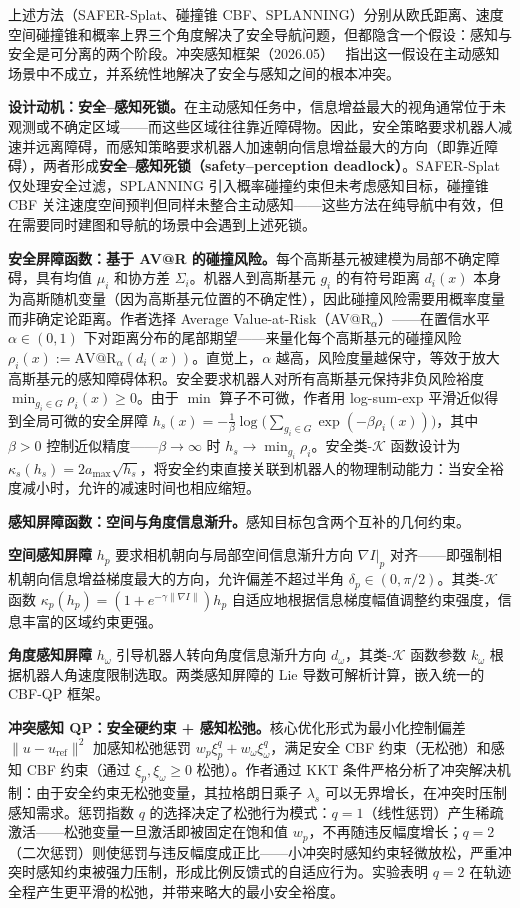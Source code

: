 上述方法（SAFER-Splat、碰撞锥 CBF、SPLANNING）分别从欧氏距离、速度空间碰撞锥和概率上界三个角度解决了安全导航问题，但都隐含一个假设：感知与安全是可分离的两个阶段。冲突感知框架（2026.05）~\cite{2605_20566} 指出这一假设在主动感知场景中不成立，并系统性地解决了安全与感知之间的根本冲突。

\textbf{设计动机：安全--感知死锁。}在主动感知任务中，信息增益最大的视角通常位于未观测或不确定区域——而这些区域往往靠近障碍物。因此，安全策略要求机器人减速并远离障碍，而感知策略要求机器人加速朝向信息增益最大的方向（即靠近障碍），两者形成\textbf{安全--感知死锁（safety--perception deadlock）}。SAFER-Splat 仅处理安全过滤，SPLANNING 引入概率碰撞约束但未考虑感知目标，碰撞锥 CBF 关注速度空间预判但同样未整合主动感知——这些方法在纯导航中有效，但在需要同时建图和导航的场景中会遇到上述死锁。

\textbf{安全屏障函数：基于 AV@R 的碰撞风险。}每个高斯基元被建模为局部不确定障碍，具有均值 $\mu_i$ 和协方差 $\Sigma_i$。机器人到高斯基元 $g_i$ 的有符号距离 $d_i(x)$ 本身为高斯随机变量（因为高斯基元位置的不确定性），因此碰撞风险需要用概率度量而非确定论距离。作者选择 Average Value-at-Risk（AV@R$_\alpha$）——在置信水平 $\alpha \in (0,1)$ 下对距离分布的尾部期望——来量化每个高斯基元的碰撞风险 $\rho_i(x) := \text{AV@R}_\alpha(d_i(x))$。直觉上，$\alpha$ 越高，风险度量越保守，等效于放大高斯基元的感知障碍体积。安全要求机器人对所有高斯基元保持非负风险裕度 $\min_{g_i \in G} \rho_i(x) \geq 0$。由于 $\min$ 算子不可微，作者用 log-sum-exp 平滑近似得到全局可微的安全屏障 $h_s(x) = -\frac{1}{\beta}\log\bigl(\sum_{g_i \in G}\exp(-\beta \rho_i(x))\bigr)$，其中 $\beta > 0$ 控制近似精度——$\beta \to \infty$ 时 $h_s \to \min_{g_i} \rho_i$。安全类-$\mathcal{K}$ 函数设计为 $\kappa_s(h_s) = 2 a_{\max} \sqrt{h_s}$，将安全约束直接关联到机器人的物理制动能力：当安全裕度减小时，允许的减速时间也相应缩短。

\textbf{感知屏障函数：空间与角度信息渐升。}感知目标包含两个互补的几何约束。

\textbf{空间感知屏障} $h_p$ 要求相机朝向与局部空间信息渐升方向 $\nabla I|_p$ 对齐——即强制相机朝向信息增益梯度最大的方向，允许偏差不超过半角 $\delta_p \in (0, \pi/2)$。其类-$\mathcal{K}$ 函数 $\kappa_p(h_p) = (1 + e^{-\gamma \|\nabla I\|}) h_p$ 自适应地根据信息梯度幅值调整约束强度，信息丰富的区域约束更强。

\textbf{角度感知屏障} $h_\omega$ 引导机器人转向角度信息渐升方向 $d_\omega$，其类-$\mathcal{K}$ 函数参数 $k_\omega$ 根据机器人角速度限制选取。两类感知屏障的 Lie 导数可解析计算，嵌入统一的 CBF-QP 框架。

\textbf{冲突感知 QP：安全硬约束 + 感知松弛。}核心优化形式为最小化控制偏差 $\|u - u_\text{ref}\|^2$ 加感知松弛惩罚 $w_p \xi_p^q + w_\omega \xi_\omega^q$，满足安全 CBF 约束（无松弛）和感知 CBF 约束（通过 $\xi_p, \xi_\omega \geq 0$ 松弛）。作者通过 KKT 条件严格分析了冲突解决机制：由于安全约束无松弛变量，其拉格朗日乘子 $\lambda_s$ 可以无界增长，在冲突时压制感知需求。惩罚指数 $q$ 的选择决定了松弛行为模式：$q=1$（线性惩罚）产生稀疏激活——松弛变量一旦激活即被固定在饱和值 $w_p$，不再随违反幅度增长；$q=2$（二次惩罚）则使惩罚与违反幅度成正比——小冲突时感知约束轻微放松，严重冲突时感知约束被强力压制，形成比例反馈式的自适应行为。实验表明 $q=2$ 在轨迹全程产生更平滑的松弛，并带来略大的最小安全裕度。

